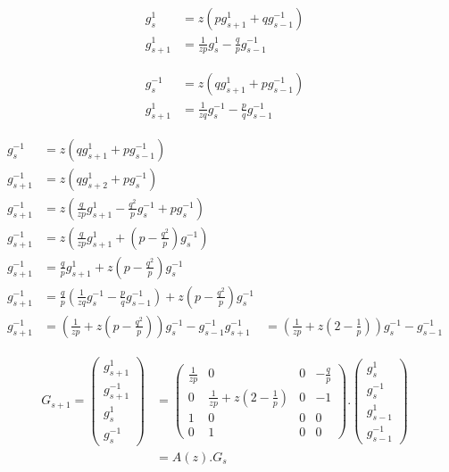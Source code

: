 \documentclass{article}
\newcommand{\g}[2]{g_{#1}^{#2}}
\begin{document}
\begin{align*}
\g{s}{1} &= z ( p  \g{s+1}{1} + q \g{s-1}{-1} ) \\
\g{s+1}{1} &= \frac{1}{z p} \g{s}{1} - \frac{q}{p} \g{s-1}{-1} 
\end{align*}

\begin{align*}
\g{s}{-1} &= z ( q \g{s+1}{1} + p \g{s-1}{-1} ) \\
\g{s+1}{1} &= \frac{1}{z q} \g{s}{-1} - \frac{p}{q} \g{s-1}{-1} 
\end{align*}

\begin{align*}
\g{s}{-1} &= z ( q \g{s+1}{1} + p \g{s-1}{-1} ) \\
\g{s+1}{-1} &= z ( q \g{s+2}{1} + p \g{s}{-1} ) \\
\g{s+1}{-1} &= z ( \frac{q}{z p} \g{s+1}{1} - \frac{q^2}{p} \g{s}{-1} + p \g{s}{-1} ) \\
\g{s+1}{-1} &= z ( \frac{q}{z p} \g{s+1}{1} + (p - \frac{q^2}{p}) \g{s}{-1}  ) \\
\g{s+1}{-1} &=  \frac{q}{p} \g{s+1}{1} + z(p - \frac{q^2}{p}) \g{s}{-1}  \\
\g{s+1}{-1} &=  \frac{q}{p} ( \frac{1}{z q} \g{s}{-1} - \frac{p}{q} \g{s-1}{-1} ) + z(p - \frac{q^2}{p}) \g{s}{-1}  \\
\g{s+1}{-1} &=  (\frac{1}{z p}   + z(p - \frac{q^2}{p})) \g{s}{-1}  -  \g{s-1}{-1} 
\g{s+1}{-1} &=  (\frac{1}{z p}   + z(2 - \frac{1}{p})) \g{s}{-1}  -  \g{s-1}{-1} 
\end{align*}

\begin{align*}
G_{s+1} = 
\begin{pmatrix} 
\g{s+1}{1} \\ \g{s+1}{-1} \\ \g{s}{1} \\ \g{s}{-1} 
\end{pmatrix}
&= 
\begin{pmatrix} 
\frac{1}{z p} & 0 &  0 &  -\frac{q}{p} \\
0 & \frac{1}{z p}   + z(2 - \frac{1}{p}) & 0 & -1 \\
1 & 0 &  0 & 0\\
0 & 1 &  0 & 0
\end{pmatrix}
.
\begin{pmatrix} 
\g{s}{1} \\ \g{s}{-1} \\ \g{s-1}{1} \\ \g{s-1}{-1} 
\end{pmatrix} \\
&= 
A(z). G_s
\end{align*}
\end{document}
